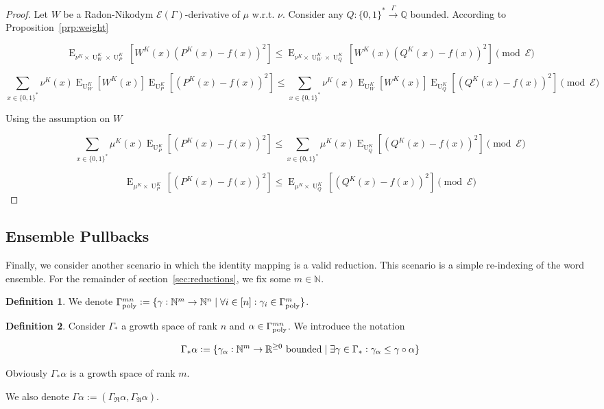 \documentclass{article}
\numberwithin{equation}{section}
\theoremstyle{definition}
\newtheorem{definition}{Definition}[section]
\theoremstyle{plain}
\newcommand{\Bool}{\{0,1\}}
\newcommand{\Words}{{\Bool^*}}
\DeclareMathOperator{\E}{E}
\DeclareMathOperator{\Un}{U}
\newcommand{\Nats}{\mathbb{N}}
\newcommand{\Rats}{\mathbb{Q}}
\newcommand{\Reals}{\mathbb{R}}
\newcommand{\GrowR}{\Gamma_{\mathfrak{R}}}
\newcommand{\GrowA}{\Gamma_{\mathfrak{A}}}
\newcommand{\Fall}{\mathcal{E}}
\newcommand{\EG}{\Fall(\Gamma)}
\newcommand{\GammaPoly}{\Gamma_{\textnormal{poly}}}
\newcommand{\Scheme}{\xrightarrow{\Gamma}}
\begin{document}
\begin{proof}

Let ${W}$ be a Radon-Nikodym ${\EG}$-derivative of ${\mu}$ w.r.t. ${\nu}$. Consider any ${Q: \Words \Scheme \Rats}$ bounded. According to Proposition~\ref{prp:weight}

\[\E_{\nu^{K} \times \Un_W^K \times \Un_P^K}[W^K(x)(P^K(x)-f(x))^2] \leq \E_{\nu^{K} \times \Un_W^K \times \Un_Q^K}[W^K(x)(Q^K(x)-f(x))^2] \pmod \Fall\]

\[\sum_{x \in \Words} \nu^{K}(x) \E_{\Un_W^K}[W^K(x)] \E_{\Un_P^K}[(P^K(x)-f(x))^2] \leq \sum_{x \in \Words} \nu^{K}(x) \E_{\Un_W^K}[W^K(x)] \E_{\Un_Q^K}[(Q^K(x)-f(x))^2] \pmod \Fall\]

Using the assumption on ${W}$

\[\sum_{x \in \Words} \mu^{K}(x) \E_{\Un_P^K}[(P^K(x)-f(x))^2] \leq \sum_{x \in \Words} \mu^{K}(x) \E_{\Un_Q^K}[(Q^K(x)-f(x))^2] \pmod \Fall\]

\[\E_{\mu^{K} \times \Un_P^K}[(P^K(x)-f(x))^2] \leq \E_{\mu^{K} \times \Un_Q^K}[(Q^K(x)-f(x))^2] \pmod \Fall\]
%
\end{proof}

\subsection{Ensemble Pullbacks}

Finally, we consider another scenario in which the identity mapping is a valid reduction. This scenario is a simple re-indexing of the word ensemble. For the remainder of section~\ref{sec:reductions}, we fix some ${m \in \Nats}$.

\begin{samepage}
\begin{definition}

We denote ${\GammaPoly^{mn}:=\{\gamma: \Nats^m \rightarrow \Nats^n \mid \forall i \in [n]: \gamma_i \in \GammaPoly^m \}}$.

\end{definition}
\end{samepage}

\begin{samepage}
\begin{definition}

Consider ${\Gamma_*}$ a growth space of rank ${n}$ and ${\alpha \in \GammaPoly^{mn}}$. We introduce the notation

\begin{equation}
\label{eqn:tbd}
\Gamma_*\alpha:=\{\gamma_\alpha: \Nats^m \rightarrow \Reals^{\geq 0} \textnormal{ bounded} \mid \exists \gamma \in \Gamma_*: \gamma_\alpha \leq \gamma \circ \alpha\}
\end{equation}

Obviously ${\Gamma_*\alpha}$ is a growth space of rank ${m}$.

We also denote ${\Gamma \alpha := (\GrowR \alpha, \GrowA \alpha)}$.

\end{definition}
\end{samepage}
\end{document}
